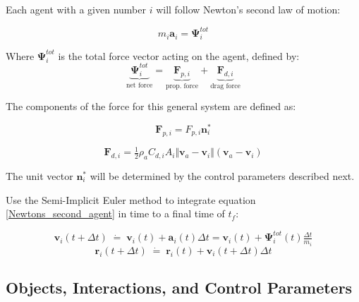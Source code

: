 \documentclass{article}
\begin{document}
Each agent with a given number $i$ will follow Newton's second law of motion: 

\begin{equation}
    m_i\boldsymbol{a}_i = \boldsymbol{\Psi}^{tot}_i \label{Newtons_second_agent}
\end{equation}

Where $\boldsymbol{\Psi}^{tot}_i$ is the total force vector acting on the agent, defined by: 
\begin{equation}\label{fTot}
    \underbrace{\boldsymbol{\Psi}^{tot}_i}_{\text{net force}} = \underbrace{\boldsymbol{F}_{p, i}}_{\text{prop. force}} + \underbrace{\boldsymbol{F}_{d, i}}_{\text{drag force}}
\end{equation}

The components of the force for this general system are defined as: 

\begin{equation} \label{fProp}
    \boldsymbol{F}_{p, i} = F_{p,i}\boldsymbol{n}^*_i 
\end{equation}

\begin{equation} \label{fDrag}
    \boldsymbol{F}_{d, i} = \tfrac{1}{2}\rho_aC_{d, i}A_i\Vert\boldsymbol{v}_a - \boldsymbol{v}_i\Vert (\boldsymbol{v}_a - \boldsymbol{v}_i)
\end{equation}

The unit vector $\boldsymbol{n}^*_i$ will be determined by the control parameters described next.

Use the Semi-Implicit Euler method to integrate equation \ref{Newtons_second_agent} in time to a final time of $t_f$: 

\begin{equation}\label{velocity}
    \boldsymbol{v}_i(t + \Delta t) \; \dot{=} \; \boldsymbol{v}_i(t) +  \boldsymbol{a}_i(t)\Delta t = \boldsymbol{v}_i(t) + \boldsymbol{\Psi}^{tot}_i(t)\tfrac{\Delta t}{m_i}
\end{equation}
\begin{equation}\label{position}
 \boldsymbol{r}_i(t +\Delta t) \; \dot{=} \; \boldsymbol{r}_i(t) +  \boldsymbol{v}_i(t+ \Delta t)\Delta t
\end{equation}

\vspace{.1 in}

\newpage

\subsection*{Objects, Interactions, and Control Parameters}
\end{document}
